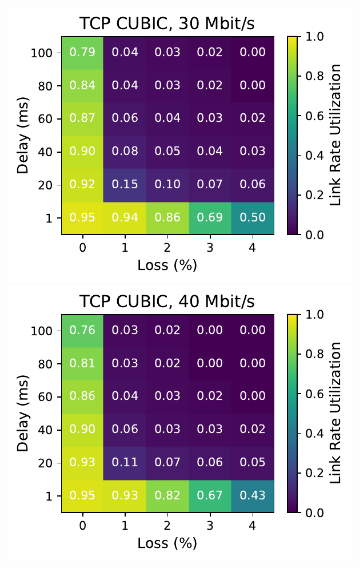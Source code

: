 \begin{figure}[ht]
\begin{subfigure}[b]{0.22\linewidth}
        \includegraphics[width=\linewidth,trim={0 0 2cm 0},clip]{splitting-paper/figures/heatmaps/heatmap_tcp_cubic_30mbps.pdf}
        \includegraphics[width=\linewidth,trim={0 0 2cm 0},clip]{splitting-paper/figures/heatmaps/heatmap_tcp_cubic_40mbps.pdf}

\end{subfigure}
\end{figure}

